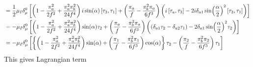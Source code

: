 \documentclass{article}
\begin{document}
\begin{align*}
    [\Sigma, v_\mu] & = 
    \frac{1}{2} \mu_I \delta^0_\mu
    \left[
        \left(
            1 
            - \frac{\pi_a^2}{2f^2}
            + \frac{\pi_a^2\pi_b^2}{24f^4}
        \right)
        i \sin(\alpha) \com{\tau_3}{\tau_1}
        + 
        \left(
            \frac{\pi_a}{f} 
            - \frac{\pi_b^2\pi_a}{6f^3} 
        \right)
        \left(
            i\com{\tau_a}{\tau_3} 
            - 2i\delta_{a1}\sin(\frac{\alpha}{2})^2\com{\tau_3}{\tau_1}
        \right)
    \right] \\
    & =
    - \mu_I \delta^0_\mu
    \left[
        \left(
            1 
            - \frac{\pi_a^2}{2f^2}
            + \frac{\pi_a^2\pi_b^2}{24f^4}
        \right)
        \sin(\alpha) \tau_2
        + 
        \left(
            \frac{\pi_a}{f} 
            - \frac{\pi_b^2\pi_a}{6f^3} 
        \right)
        \left(
            (\delta_{a1}\tau_2-\delta_{a2}\tau_1)
            - 2\delta_{a1}\sin(\frac{\alpha}{2})^2 \tau_2
        \right)
    \right] \\
    & =
    - \mu_I \delta^0_\mu
    \left[
        \left\{
        \left(
            1 
            - \frac{\pi_a^2}{2f^2}
            + \frac{\pi_a^2\pi_b^2}{24f^4}
        \right)
        \sin(\alpha)
        + 
        \left(
            \frac{\pi_1}{f} 
            - \frac{\pi_b^2\pi_1}{6f^3} 
        \right) \cos(\alpha)
        \right\} \tau_2
        -
        \left(
            \frac{\pi_2}{f} 
            - \frac{\pi_b^2\pi_2}{6f^3} 
        \right)
        \tau_1
    \right]
\end{align*}
This gives Lagrangian term
\end{document}
